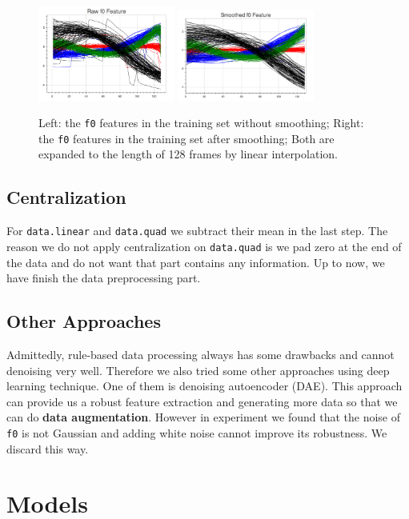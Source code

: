 \documentclass[a4paper]{article}
\begin{document}
\begin{figure}[H]
	\centering
	\includegraphics[width = 0.4\textwidth]{figs/f0}
	\includegraphics[width = 0.4\textwidth]{figs/Sf0}
	\caption{Left: the \texttt{f0} features in the training set without smoothing; Right: the \texttt{f0} features in the training set after smoothing; Both are expanded to the length of 128 frames by linear interpolation.}
\end{figure}

\subsection{Centralization}
For \texttt{data.linear} and \texttt{data.quad} we subtract their mean in the last step. The reason we do not apply centralization on  \texttt{data.quad} is we pad zero at the end of the data and do not want that part contains any information. Up to now, we have finish the data preprocessing part.

\subsection{Other Approaches}
Admittedly, rule-based data processing always has some drawbacks and cannot denoising very well. Therefore we also tried some other approaches using deep learning technique. One of them is denoising autoencoder (DAE). This approach can provide us a robust feature extraction and generating more data so that we can do  {\bf data augmentation}. However in experiment we found that the noise of \texttt{f0} is not Gaussian and adding white noise cannot improve its robustness. We discard this way.

\section{Models}
\end{document}
